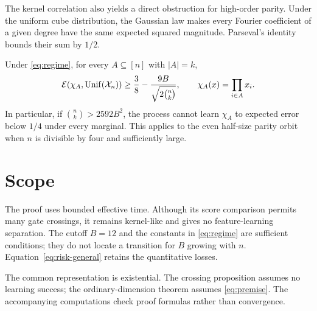 \documentclass[11pt,letterpaper,pmlr,twoside]{jmlr}
\newcommand{\X}{\mathcal X}\newcommand{\Hc}{\mathcal H}
\begin{document}
The kernel correlation also yields a direct obstruction for high-order parity. Under the uniform cube distribution, the Gaussian law makes every Fourier coefficient of a given degree have the same expected squared magnitude. Parseval's identity bounds their sum by $1/2$.

\begin{corollary}
\label{cor:parity}
Under \eqref{eq:regime}, for every $A\subseteq[n]$ with $|A|=k$,
\begin{equation}
 \Risk(\chi_A,\Unif(\X_n))
 \ge\frac38-\frac{9B}{\sqrt{2\binom nk}},
 \qquad \chi_A(x)=\prod_{i\in A}x_i.
 \label{eq:parity}
\end{equation}
In particular, if $\binom nk>2592B^2$, the process cannot learn $\chi_A$ to expected error below $1/4$ under every marginal. This applies to the even half-size parity orbit when $n$ is divisible by four and sufficiently large.
\end{corollary}

\section{Scope}
The proof uses bounded effective time. Although its score comparison permits many gate crossings, it remains kernel-like and gives no feature-learning separation. The cutoff $B=12$ and the constants in \eqref{eq:regime} are sufficient conditions; they do not locate a transition for $B$ growing with $n$. Equation~\eqref{eq:risk-general} retains the quantitative losses.

The common representation is existential. The crossing proposition assumes no learning success; the ordinary-dimension theorem assumes \eqref{eq:premise}. The accompanying computations check proof formulas rather than convergence.
\end{document}
